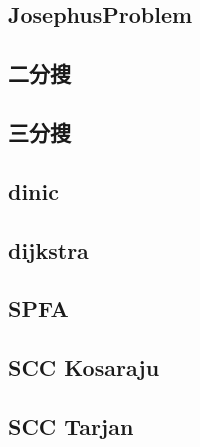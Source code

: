     \subsection{JosephusProblem}
        
    \subsection{二分搜}
         \columnbreak
    \subsection{三分搜}
         \columnbreak
    \subsection{dinic}
         \columnbreak
    \subsection{dijkstra}
         \columnbreak
    \subsection{SPFA}
        
    \subsection{SCC Kosaraju}
         \columnbreak
    \subsection{SCC Tarjan}
         \columnbreak
